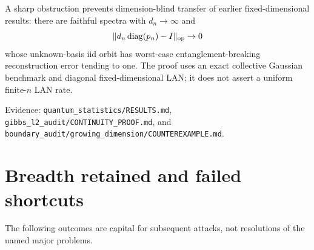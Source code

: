 \documentclass[11pt]{article}
\begin{document}
A sharp obstruction prevents dimension-blind transfer of earlier fixed-dimensional results: there are faithful spectra with $d_n\to\infty$ and
\[
 \|d_n\operatorname{diag}(p_n)-I\|_{\rm op}\to0
\]
whose unknown-basis iid orbit has worst-case entanglement-breaking reconstruction error tending to one. The proof uses an exact collective Gaussian benchmark and diagonal fixed-dimensional LAN; it does not assert a uniform finite-$n$ LAN rate.

Evidence: \texttt{quantum\_statistics/RESULTS.md}, \texttt{gibbs\_l2\_audit/CONTINUITY\_PROOF.md}, and \texttt{boundary\_audit/growing\_dimension/COUNTEREXAMPLE.md}.

\section{Breadth retained and failed shortcuts}
The following outcomes are capital for subsequent attacks, not resolutions of the named major problems.
\end{document}
